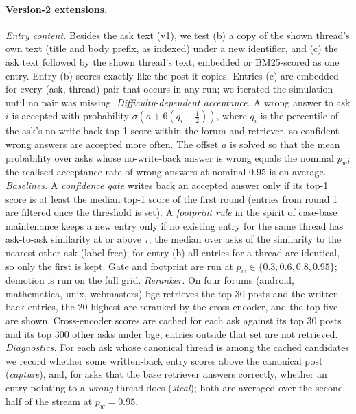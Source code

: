 \documentclass[11pt]{article}
\begin{document}
\paragraph{Version-2 extensions.} \emph{Entry content.} Besides the ask text (v1), we test (b) a copy of the shown thread's own text (title and body prefix, as indexed) under a new identifier, and (c) the ask text followed by the shown thread's text, embedded or BM25-scored as one entry. Entry (b) scores exactly like the post it copies. Entries (c) are embedded for every (ask, thread) pair that occurs in any run; we iterated the simulation until no pair was missing. \emph{Difficulty-dependent acceptance.} A wrong answer to ask $i$ is accepted with probability $\sigma(a+6(q_i-\tfrac12))$, where $q_i$ is the percentile of the ask's no-write-back top-1 score within the forum and retriever, so confident wrong answers are accepted more often. The offset $a$ is solved so that the mean probability over asks whose no-write-back answer is wrong equals the nominal $p_w$; the realised acceptance rate of wrong answers at nominal 0.95 is \realizedNN{} on average. \emph{Baselines.} A \emph{confidence gate} writes back an accepted answer only if its top-1 score is at least the median top-1 score of the first round (entries from round 1 are filtered once the threshold is set). A \emph{footprint rule} in the spirit of case-base maintenance \citep{smyth1995forget,zhu1999add} keeps a new entry only if no existing entry for the same thread has ask-to-ask similarity at or above $\tau$, the median over asks of the similarity to the nearest other ask (label-free); for entry (b) all entries for a thread are identical, so only the first is kept. Gate and footprint are run at $p_w\in\{0.3,0.6,0.8,0.95\}$; demotion is run on the full grid. \emph{Reranker.} On four forums (android, mathematica, unix, webmasters) bge retrieves the top 30 posts and the written-back entries, the 20 highest are reranked by the cross-encoder, and the top five are shown. Cross-encoder scores are cached for each ask against its top 30 posts and its top 300 other asks under bge; entries outside that set are not retrieved. \emph{Diagnostics.} For each ask whose canonical thread is among the cached candidates we record whether some written-back entry scores above the canonical post (\emph{capture}), and, for asks that the base retriever answers correctly, whether an entry pointing to a \emph{wrong} thread does (\emph{steal}); both are averaged over the second half of the stream at $p_w=0.95$.
\end{document}
